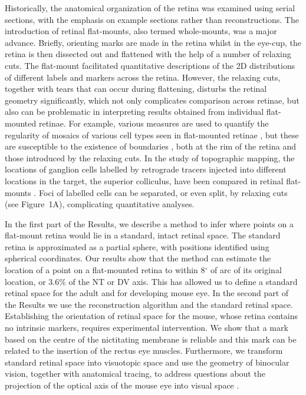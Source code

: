 \documentclass[10pt]{article}
\newcounter{Figure}
\begin{document}
Historically, the anatomical organization of the retina was examined
using serial sections, with the emphasis on example sections rather
than  reconstructions. The introduction of retinal flat-mounts, also
termed whole-mounts, \cite{Stone1981} was a major advance. Briefly,
orienting marks are made in the retina whilst in the eye-cup, the
retina is then dissected out and flattened with the help of a number
of relaxing cuts. The flat-mount facilitated quantitative
descriptions of the 2D distributions of different labels and markers
across the retina. However, the relaxing cuts, together with tears
that can occur during flattening, disturbs the retinal geometry
significantly, which not only complicates comparison across retinae,
but also can be problematic in interpreting results obtained from
individual flat-mounted retinae. For example, various measures are
used to quantify the regularity of mosaics of various cell types seen
in flat-mounted retinae \cite{WassleBoycott1991,RavenEtal2003},
but these are susceptible to the existence of boundaries \cite{Cook1996},
both at the rim of the retina and those introduced by the relaxing
cuts. In the study of topographic mapping, the locations of ganglion
cells labelled by retrograde tracers injected into different
locations in the target, the superior colliculus, have been compared
in retinal flat{}-mounts \cite{ReberEtal2004,RashidEtal2005}.
Foci of labelled cells can be separated, or even split, by relaxing
cuts (see Figure~1A), complicating quantitative analyses.

In the first part of the Results, we describe a method to infer where
points on a flat-mount retina would lie in a standard, intact retinal
space. The standard retina is approximated as a partial sphere, with
positions identified using spherical coordinates. Our results show
that the method can estimate the location of a point on a
flat-mounted retina to within 8$^{\circ}$ of arc of its original
location, or 3.6\% of the NT or DV axis. This has allowed us to
define a standard retinal space for the adult and for developing
mouse eye. In the second part of the Results we use the
reconstruction algorithm and the standard retinal space. Establishing
the orientation of retinal space for the mouse, whose retina contains
no intrinsic markers, requires experimental intervention. We show
that a mark based on the centre of the nictitating membrane is
reliable and  this mark can be related to the insertion of the rectus
eye muscles. Furthermore, we transform standard retinal space into
visuotopic space and use the geometry of binocular vision, together
with anatomical tracing, to address questions about the projection of
the optical axis of the mouse eye into visual space \cite{Drager1978,OommenStahl2008,ColemanEtal2009}. 
\end{document}
